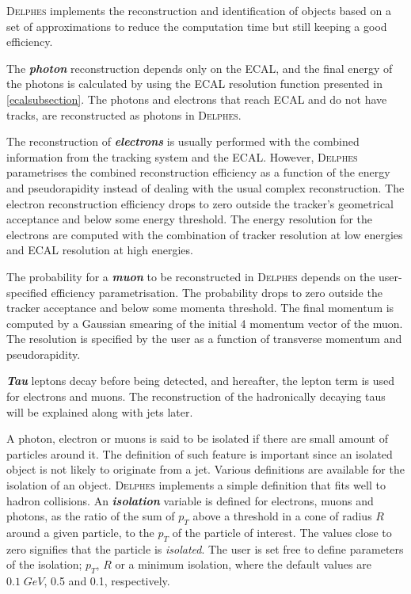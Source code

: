 {\textsc{Delphes} implements the reconstruction and identification of objects based on a set of approximations to reduce the computation time but still keeping a good efficiency.

The \emph{\bf{photon}} reconstruction depends only on the ECAL, and the final energy of the photons is calculated by using the ECAL resolution function presented in \autoref{ecalsubsection}. The photons and electrons that reach ECAL and do not have tracks, are reconstructed as photons in \textsc{Delphes}.

The reconstruction of \emph{\bf{electrons}} is usually performed with the combined information from the tracking system and the ECAL. However, \textsc{Delphes} parametrises the combined reconstruction efficiency as a function of the energy and pseudorapidity instead of dealing with the usual complex reconstruction. The electron reconstruction efficiency drops to zero outside the tracker's geometrical acceptance and below some energy threshold. The energy resolution for the electrons are computed with the combination of tracker resolution at low energies and ECAL resolution at high energies.

The probability for a \emph{\bf{muon}} to be reconstructed in \textsc{Delphes} depends on the user-specified efficiency parametrisation. The probability drops to zero outside the tracker acceptance and below some momenta threshold. The final momentum is computed by a Gaussian smearing of the initial 4 momentum vector of the muon. The resolution is specified by the user as a function of transverse momentum and pseudorapidity.

\emph{\bf{Tau}} leptons decay before being detected, and hereafter, the lepton term is used for electrons and muons. The reconstruction of the hadronically decaying taus will be explained along with jets later.

A photon, electron or muons is said to be isolated if there are small amount of particles around it. The definition of such feature is important since an isolated object is not likely to originate from a jet. Various definitions are available for the isolation of an object. \textsc{Delphes} implements a simple definition that fits well to hadron collisions. An \emph{\bf{isolation}} variable is defined for electrons, muons and photons, as the ratio of the sum of $p_T$ above a threshold in a cone of radius $R$ around a given particle, to the $p_T$ of the particle of interest. The values close to zero signifies that the particle is \emph{isolated}. The user is set free to define parameters of the isolation; $p_T$, $R$ or a minimum isolation, where the default values are $0.1 \; GeV$, 0.5 and 0.1, respectively.

}
